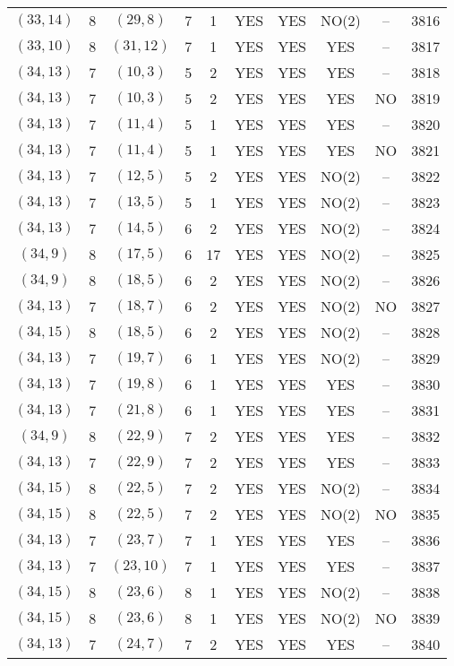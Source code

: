 \begin{longtable}{|c|c|c|c|c|c|c|c|c|c|}
$(33, 14)$ & 8 & $(29, 8)$ & 7 & 1 & YES & YES & NO(2) & -- & 3816\\
$(33, 10)$ & 8 & $(31, 12)$ & 7 & 1 & YES & YES & YES & -- & 3817\\
$(34, 13)$ & 7 & $(10, 3)$ & 5 & 2 & YES & YES & YES & -- & 3818\\
$(34, 13)$ & 7 & $(10, 3)$ & 5 & 2 & YES & YES & YES & NO & 3819\\
$(34, 13)$ & 7 & $(11, 4)$ & 5 & 1 & YES & YES & YES & -- & 3820\\
$(34, 13)$ & 7 & $(11, 4)$ & 5 & 1 & YES & YES & YES & NO & 3821\\
$(34, 13)$ & 7 & $(12, 5)$ & 5 & 2 & YES & YES & NO(2) & -- & 3822\\
$(34, 13)$ & 7 & $(13, 5)$ & 5 & 1 & YES & YES & NO(2) & -- & 3823\\
$(34, 13)$ & 7 & $(14, 5)$ & 6 & 2 & YES & YES & NO(2) & -- & 3824\\
$(34, 9)$ & 8 & $(17, 5)$ & 6 & 17 & YES & YES & NO(2) & -- & 3825\\
$(34, 9)$ & 8 & $(18, 5)$ & 6 & 2 & YES & YES & NO(2) & -- & 3826\\
$(34, 13)$ & 7 & $(18, 7)$ & 6 & 2 & YES & YES & NO(2) & NO & 3827\\
$(34, 15)$ & 8 & $(18, 5)$ & 6 & 2 & YES & YES & NO(2) & -- & 3828\\
$(34, 13)$ & 7 & $(19, 7)$ & 6 & 1 & YES & YES & NO(2) & -- & 3829\\
$(34, 13)$ & 7 & $(19, 8)$ & 6 & 1 & YES & YES & YES & -- & 3830\\
$(34, 13)$ & 7 & $(21, 8)$ & 6 & 1 & YES & YES & YES & -- & 3831\\
$(34, 9)$ & 8 & $(22, 9)$ & 7 & 2 & YES & YES & YES & -- & 3832\\
$(34, 13)$ & 7 & $(22, 9)$ & 7 & 2 & YES & YES & YES & -- & 3833\\
$(34, 15)$ & 8 & $(22, 5)$ & 7 & 2 & YES & YES & NO(2) & -- & 3834\\
$(34, 15)$ & 8 & $(22, 5)$ & 7 & 2 & YES & YES & NO(2) & NO & 3835\\
$(34, 13)$ & 7 & $(23, 7)$ & 7 & 1 & YES & YES & YES & -- & 3836\\
$(34, 13)$ & 7 & $(23, 10)$ & 7 & 1 & YES & YES & YES & -- & 3837\\
$(34, 15)$ & 8 & $(23, 6)$ & 8 & 1 & YES & YES & NO(2) & -- & 3838\\
$(34, 15)$ & 8 & $(23, 6)$ & 8 & 1 & YES & YES & NO(2) & NO & 3839\\
$(34, 13)$ & 7 & $(24, 7)$ & 7 & 2 & YES & YES & YES & -- & 3840\\

\end{longtable}
